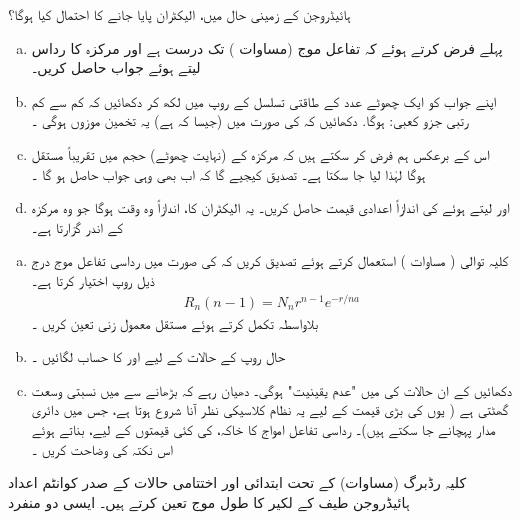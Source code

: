 ہائیڈروجن کے  زمینی حال میں، الیکٹران پایا  جانے کا احتمال کیا ہوگا؟ 
\begin{enumerate}[a.]
\item
پہلے  فرض کرتے ہوئے کہ تفاعل موج  (مساوات  )     تک درست ہے اور مرکزہ کا رداس  لیتے ہوئے  جواب حاصل کریں۔ 
\item
اپنے جواب کو ایک چھوٹے عدد  کے  طاقتی تسلسل کے روپ میں لکھ کر دکھائیں کہ کم سے کم  رتبی  جزو کعبی:     ہوگا.  دکھائیں  کہ  کی صورت میں (جیسا کہ ہے) یہ تخمین موزوں ہوگی ۔
 \item
اس کے برعکس ہم فرض کر سکتے ہیں کہ مرکزہ کے  (نہایت  چھوٹے)  حجم میں  تقریباً مستقل ہوگا لہٰذا  لیا جا سکتا ہے۔ تصدیق کیجیے گا کہ اب بھی وہی جواب حاصل  ہو گا ۔
\item
{} اور  لیتے ہوئے  کی اندازاً اعدادی قیمت حاصل کریں۔ یہ الیکٹران کا،  اندازاً وہ وقت ہوگا جو  وہ مرکزہ کے اندر گزارتا ہے۔ 
\end{enumerate}
\begin{enumerate}[a.]
\item
کلیہ توالی ( مساوات )  استعمال کرتے ہوئے تصدیق کریں کہ  کی صورت میں رداسی تفاعل موج درج ذیل روپ اختیار کرتا ہے۔ 
\begin{align*}
R_n (n - 1) = N_n r^{n - 1} e^{-r/na}
\end{align*}
بلاواسطہ تکمل کرتے ہوئے مستقل معمول زنی  تعین کریں ۔
\item
حال  روپ کے حالات کے لیے  اور  کا حساب لگائیں ۔
\item
دکھائیں کے ان حالات کی   میں "عدم یقینیت"   ہوگی۔ دھیان رہے کہ    بڑھانے سے  میں نسبتی   وسعت  گھٹتی ہے ( یوں  کی بڑی قیمت کے لیے یہ  نظام کلاسیکی نظر آنا شروع ہوتا ہے، جس میں دائری مدار پہچانے جا سکتے ہیں)۔ رداسی تفاعل امواج کا خاکہ،    کی کئی قیمتوں کے لیے،  بناتے ہوئے اس نکتہ  کی وضاحت کریں ۔
\end{enumerate}
\quad
 کلیہ رڈبرگ (مساوات) کے تحت ابتدائی اور اختتامی حالات کے صدر کوانٹم اعداد ہائیڈروجن   طیف  کے لکیر کا طول موج تعین کرتے ہیں۔ ایسی دو منفرد
